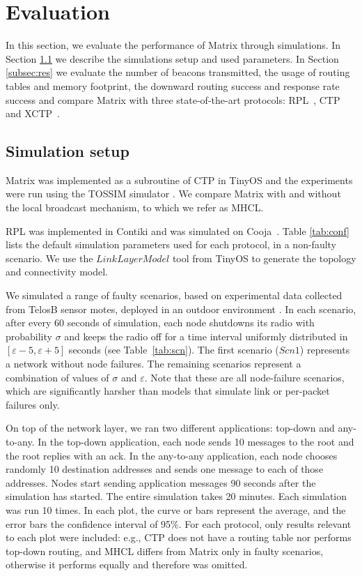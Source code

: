 \section{Evaluation}
\label{sec:results}

In this section, we evaluate the performance of Matrix through
simulations. In Section \ref{subsec:sim} we describe the simulations
setup and used parameters. In Section \ref{subsec:res} we evaluate
the number of beacons transmitted, the usage of routing tables and
memory footprint, the downward routing success and response rate success and compare Matrix
with three state-of-the-art protocols: RPL~\cite{rfc6550}, CTP~\cite{Fonseca:2009} and
XCTP~\cite{xctp}. 

\subsection{Simulation setup}\label{subsec:sim}

Matrix was implemented as a subroutine of CTP in TinyOS \cite{tinyos}
and the experiments were run using the TOSSIM simulator \cite{tossim}. We
compare Matrix with and without the local broadcast mechanism, to which we refer
as MHCL. 

RPL was implemented in Contiki \cite{Dunkels:2004} and was
simulated on Cooja~\cite{Eriksson:2009}. Table \ref{tab:conf} lists the default
simulation parameters used for each protocol, in a non-faulty scenario. We use the $LinkLayerModel$ tool from TinyOS to generate the topology and connectivity model.

We simulated a range of faulty scenarios, based on experimental data collected
from TelosB sensor motes, deployed in an outdoor
environment \cite{Baccour:2012}. In each scenario, after every 60 seconds of
simulation, each node shutdowns its radio with probability $\sigma$ and keeps
the radio off for a time interval uniformly distributed in
$[\varepsilon - 5, \varepsilon + 5]$ seconds (see Table~\ref{tab:scn}).
The first scenario ($Scn1$) represents a network without node failures. The
remaining scenarios represent a combination of values of $\sigma$ and
$\varepsilon$. Note that these are all node-failure scenarios, which are
significantly harsher than models that simulate link or per-packet
failures only.

On top of the network layer, we ran two different applications: top-down and any-to-any. In the top-down application, each node sends 10 messages to the root and the root replies with an ack. In the any-to-any application, each node chooses randomly 10 destination addresses and sends one message to each of those addresses. Nodes start sending application messages 90 seconds after the simulation has started. The entire simulation takes 20 minutes. Each simulation was run 10 times. In each plot, the curve or bars represent the average, and the error bars the confidence interval of 95\%. For each protocol, only results relevant to each plot were included: e.g., CTP does not have a routing table nor performs top-down routing, and MHCL differs from Matrix only in faulty scenarios, otherwise it performs equally and therefore was omitted.

